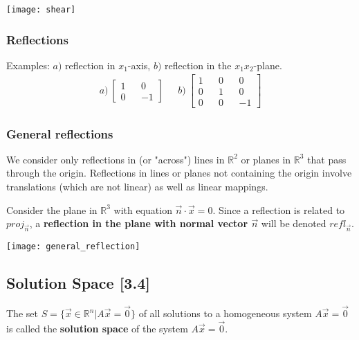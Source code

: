 \documentclass[a4paper,9pt]{extarticle}
\begin{document}
\begin{multicols*}{2}
{\centering \texttt{[image: shear]} \par}


\subsubsection{Reflections}
Examples: $a)$ reflection in $x_1$-axis, $b)$ reflection in the $x_1 x_2$-plane.
\begin{equation} \label{3.3-6}
    \begin{split}
        a) \> \begin{bmatrix}1 && 0 \\ 0 && -1\end{bmatrix}& \>\>\> b) \> \begin{bmatrix}1 && 0 && 0 \\ 0 && 1 && 0 \\ 0 && 0 && -1\end{bmatrix}
    \end{split}
\end{equation}


\subsubsection{General reflections}
We consider only reflections in (or "across") lines in $\mathbb{R}^2$ or planes in $\mathbb{R}^3$ that pass through the origin. Reflections in lines or planes not containing the origin involve translations (which are not linear) as well as linear mappings.

Consider the plane in $\mathbb{R}^3$ with equation $\vec{n} \cdot \vec{x} = 0$. Since a reflection is related to $proj_{\vec{n}}$, a \textbf{reflection in the plane with normal vector $\vec{n}$} will be denoted \textbf{$refl_{\vec{n}}$}.

{\centering \texttt{[image: general\_reflection]} \par}


\subsection{Solution Space [3.4]}
The set $S = \{\vec{x} \in \mathbb{R}^n | A \vec{x} = \vec{0}\}$ of all solutions to a homogeneous system $A \vec{x} = \vec{0}$ is called the \textbf{solution space} of the system $A \vec{x} = \vec{0}$.


\end{multicols*}
\end{document}
